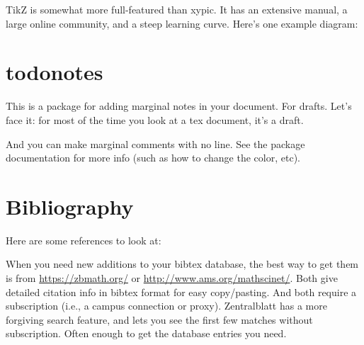 \documentclass[11pt,oneside,draft]{amsart}
\begin{document}
TikZ is somewhat more full-featured than xypic.  It has an extensive
manual, a large online community, and a steep learning curve.  Here's one
example diagram:

\begin{center}
\end{center}

\section{todonotes}
This is a package for adding  marginal notes in
your document.  For drafts.  Let's face it: for most of the time you
look at a tex document, it's a draft.

And you can make marginal comments with no line.  See the package
documentation for more info (such as how to change the color, etc).

\section{Bibliography}

Here are some references to look at:  \cite{ATC,sage,JN2010Complex,GO2012Infinite,Eve1991Cohomology,Eve1961Cohomology,EKMM1997Rings,Ada1974Stable}

When you need new additions to your bibtex database, the best way to
get them is from \url{https://zbmath.org/} or
\url{http://www.ams.org/mathscinet/}.  Both give detailed citation
info in bibtex format for easy copy/pasting.  And both require a
subscription (i.e., a campus connection or proxy).  Zentralblatt has a
more forgiving search feature, and lets you see the first few matches
without subscription.  Often enough to get the database entries you need.
\end{document}
